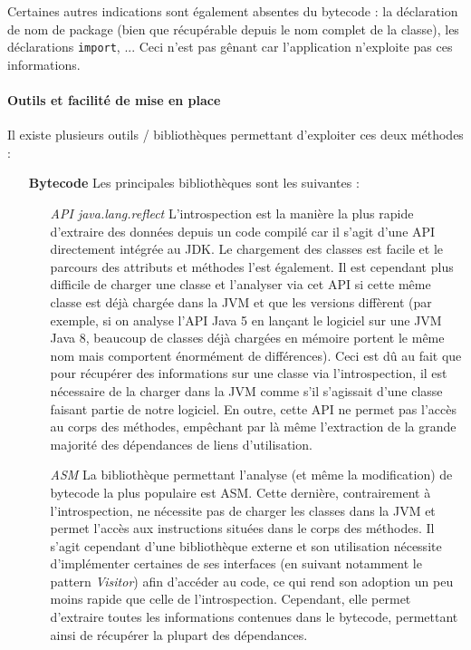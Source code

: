 \documentclass{scrartcl}
\begin{document}
    Certaines autres indications sont également absentes du bytecode : la déclaration de nom de package (bien que récupérable depuis le nom complet de la classe), les déclarations \texttt{import}, ... Ceci n'est pas gênant car l'application n'exploite pas ces informations.
    
    \paragraph{Outils et facilité de mise en place} Il existe plusieurs outils / bibliothèques permettant d'exploiter ces deux méthodes :
        \bigbreak
        \begin{itemize}
            \item[\textbf{Bytecode}] Les principales bibliothèques sont les suivantes :
            \begin{itemize}
                \smallbreak
                \item[\textit{API java.lang.reflect}]L'introspection est la manière la plus rapide d'extraire des données depuis un code compilé car il s'agit d'une API directement intégrée au JDK. Le chargement des classes est facile et le parcours des attributs et méthodes l'est également. Il est cependant plus difficile de charger une classe et l'analyser via cet API si cette même classe est déjà chargée dans la JVM et que les versions diffèrent (par exemple, si on analyse l'API Java 5 en lançant le logiciel sur une JVM Java 8, beaucoup de classes déjà chargées en mémoire portent le même nom mais comportent énormément de différences). Ceci est dû au fait que pour récupérer des informations sur une classe via l'introspection, il est nécessaire de la charger dans la JVM comme s'il s'agissait d'une classe faisant partie de notre logiciel. En outre, cette API ne permet pas l'accès au corps des méthodes, empêchant par là même l'extraction de la grande majorité des dépendances de liens d'utilisation.
                \smallbreak
                \item[\textit{ASM}\footnotemark] La bibliothèque permettant l'analyse (et même la modification) de bytecode la plus populaire est ASM. Cette dernière, contrairement à l'introspection, ne nécessite pas de charger les classes dans la JVM et permet l'accès aux instructions situées dans le corps des méthodes. Il s'agit cependant d'une bibliothèque externe et son utilisation nécessite d'implémenter certaines de ses interfaces (en suivant notamment le pattern \emph{Visitor}) afin d'accéder au code, ce qui rend son adoption un peu moins rapide que celle de l'introspection. Cependant, elle permet d'extraire toutes les informations contenues dans le bytecode, permettant ainsi de récupérer la plupart des dépendances.

\end{itemize}
\end{itemize}
\end{document}

